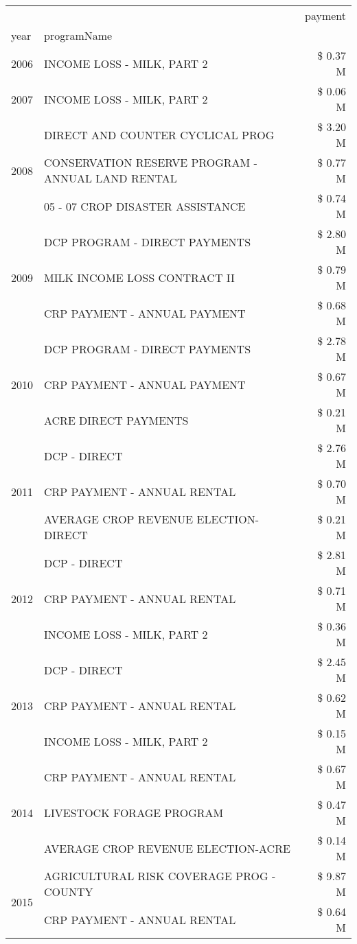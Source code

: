 \begin{tabular}{llr}
\toprule
 &  & payment \\
year & programName &  \\
\midrule
2006 & INCOME LOSS - MILK, PART 2 & \$ 0.37 M \\
\cline{1-3}
2007 & INCOME LOSS - MILK, PART 2 & \$ 0.06 M \\
\cline{1-3}
\multirow[t]{3}{*}{2008} & DIRECT AND COUNTER CYCLICAL PROG & \$ 3.20 M \\
 & CONSERVATION RESERVE PROGRAM - ANNUAL LAND RENTAL & \$ 0.77 M \\
 & 05 - 07 CROP DISASTER ASSISTANCE & \$ 0.74 M \\
\cline{1-3}
\multirow[t]{3}{*}{2009} & DCP PROGRAM - DIRECT PAYMENTS & \$ 2.80 M \\
 & MILK INCOME LOSS CONTRACT II & \$ 0.79 M \\
 & CRP PAYMENT - ANNUAL PAYMENT & \$ 0.68 M \\
\cline{1-3}
\multirow[t]{3}{*}{2010} & DCP PROGRAM - DIRECT PAYMENTS & \$ 2.78 M \\
 & CRP PAYMENT - ANNUAL PAYMENT & \$ 0.67 M \\
 & ACRE DIRECT PAYMENTS & \$ 0.21 M \\
\cline{1-3}
\multirow[t]{3}{*}{2011} & DCP - DIRECT & \$ 2.76 M \\
 & CRP PAYMENT - ANNUAL RENTAL & \$ 0.70 M \\
 & AVERAGE CROP REVENUE ELECTION-DIRECT & \$ 0.21 M \\
\cline{1-3}
\multirow[t]{3}{*}{2012} & DCP - DIRECT & \$ 2.81 M \\
 & CRP PAYMENT - ANNUAL RENTAL & \$ 0.71 M \\
 & INCOME LOSS - MILK, PART 2 & \$ 0.36 M \\
\cline{1-3}
\multirow[t]{3}{*}{2013} & DCP - DIRECT & \$ 2.45 M \\
 & CRP PAYMENT - ANNUAL RENTAL & \$ 0.62 M \\
 & INCOME LOSS - MILK, PART 2 & \$ 0.15 M \\
\cline{1-3}
\multirow[t]{3}{*}{2014} & CRP PAYMENT - ANNUAL RENTAL & \$ 0.67 M \\
 & LIVESTOCK FORAGE PROGRAM & \$ 0.47 M \\
 & AVERAGE CROP REVENUE ELECTION-ACRE & \$ 0.14 M \\
\cline{1-3}
\multirow[t]{3}{*}{2015} & AGRICULTURAL RISK COVERAGE PROG - COUNTY & \$ 9.87 M \\
 & CRP PAYMENT - ANNUAL RENTAL & \$ 0.64 M \\

\end{tabular}
